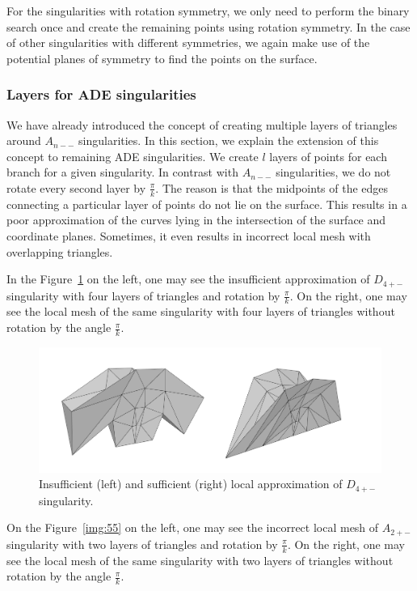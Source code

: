 For the singularities with rotation
symmetry, we only need to perform the binary search once and create the remaining 
points using rotation symmetry.
In the case of other singularities with different symmetries, we again make use of the
potential planes of symmetry to find the points on the surface.

\subsubsection*{Layers for ADE singularities}
We have already introduced the concept of creating multiple layers of triangles around
$A_{n--}$ singularities. In this section, we explain the extension of this concept
to remaining ADE singularities. We create $l$ layers of
points for each branch for a given singularity. In contrast with $A_{n--}$ singularities, we do not 
rotate every second layer by $\frac{\pi}{k}$. The reason is that the midpoints of
the edges connecting a particular layer of points do not lie on the surface. This results
in a poor approximation of the curves lying in the intersection of the surface 
and coordinate planes. Sometimes, it even results in incorrect local mesh with 
overlapping triangles.

In the Figure~\ref{img:56} on the left, one may see the insufficient approximation
of $D_{4+-}$ singularity with
four layers of triangles and rotation by $\frac{\pi}{k}$. On the right, one
may see the local mesh of the same singularity with four layers of triangles
without rotation by the angle $\frac{\pi}{k}$.

\begin{figure}
    \centerline{\includegraphics[scale=0.4]{images/img56}}
    \caption[Insufficient and sufficient local approximation]
    {Insufficient (left) and sufficient (right) local approximation of $D_{4+-}$ singularity.}
    \label{img:56}
\end{figure}

On the Figure~\ref{img:55} on the left, one may see the incorrect local mesh
of $A_{2+-}$ singularity with
two layers of triangles and rotation by $\frac{\pi}{k}$. On the right, one
may see the local mesh of the same singularity with two layers of triangles
without rotation by the angle $\frac{\pi}{k}$.

